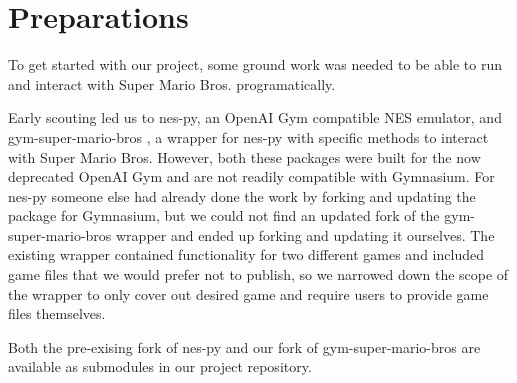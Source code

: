 \section{Preparations}

To get started with our project, some ground work was needed to be able to run and interact with Super Mario Bros. programatically.

Early scouting led us to nes-py, an OpenAI Gym compatible NES emulator, and gym-super-mario-bros \citep{gym-smb}, a wrapper for nes-py with specific methods to interact with Super Mario Bros. However, both these packages were built for the now deprecated OpenAI Gym and are not readily compatible with Gymnasium. For nes-py someone else had already done the work by forking and updating the package for Gymnasium, but we could not find an updated fork of the gym-super-mario-bros wrapper and ended up forking and updating it ourselves. The existing wrapper contained functionality for two different games and included game files that we would prefer not to publish, so we narrowed down the scope of the wrapper to only cover out desired game and require users to provide game files themselves.

Both the pre-exising fork of nes-py and our fork of gym-super-mario-bros are available as submodules in our project repository.
